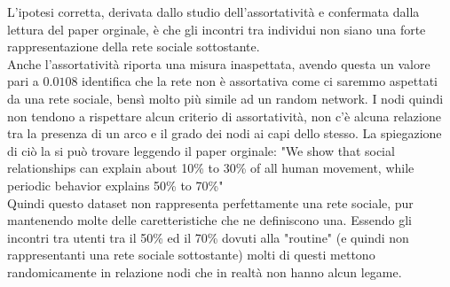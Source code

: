\documentclass[a4paper]{article}
\begin{document}
L'ipotesi corretta, derivata dallo studio dell'assortatività e confermata dalla lettura del paper orginale, è che gli incontri tra individui non siano una forte rappresentazione della rete sociale sottostante.\\
Anche l'assortatività riporta una misura inaspettata, avendo questa un valore pari a $0.0108$ identifica che la rete non è assortativa come ci saremmo aspettati da una rete sociale, bensì molto più simile ad un random network.
I nodi quindi non tendono a rispettare alcun criterio di assortatività, non c'è alcuna relazione tra la presenza di un arco e il grado dei nodi ai capi dello stesso.
La spiegazione di ciò la si può trovare leggendo il paper orginale: 
"We show that social relationships can explain about 10\% to 30\% of all human movement, while periodic behavior explains 50\% to 70\%"\cite{original_paper}\\
Quindi questo dataset non rappresenta perfettamente una rete sociale, pur mantenendo molte delle caretteristiche che ne definiscono una.
Essendo gli incontri tra utenti tra il 50\% ed il 70\% dovuti alla "routine" (e quindi non rappresentanti una rete sociale sottostante) molti di questi mettono randomicamente in relazione nodi che in realtà non hanno alcun legame.
\end{document}
